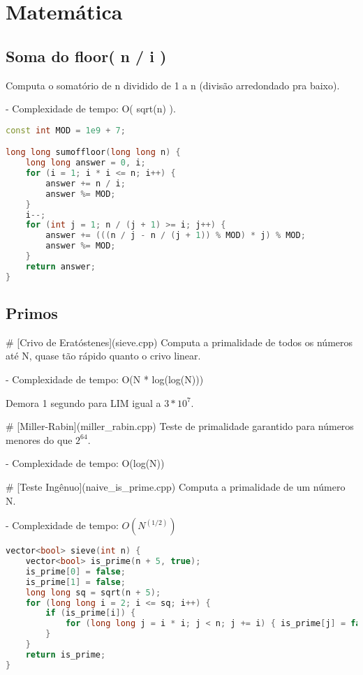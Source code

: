 \documentclass[11pt, a4paper, twoside]{article}
\begin{document}
\newpage
%
%
%
%

\section{Matemática}


\subsection{Soma do floor( n / i )}



Computa o somatório de n dividido de 1 a n (divisão arredondado pra baixo).

- Complexidade de tempo: O( sqrt(n) ).

\begin{lstlisting}[language=C++]
const int MOD = 1e9 + 7;

long long sumoffloor(long long n) {
    long long answer = 0, i;
    for (i = 1; i * i <= n; i++) {
        answer += n / i;
        answer %= MOD;
    }
    i--;
    for (int j = 1; n / (j + 1) >= i; j++) {
        answer += (((n / j - n / (j + 1)) % MOD) * j) % MOD;
        answer %= MOD;
    }
    return answer;
}
\end{lstlisting}

\subsection{Primos}



\# [Crivo de Eratóstenes](sieve.cpp)
Computa a primalidade de todos os números até N, quase tão rápido quanto o crivo linear.

- Complexidade de tempo: O(N * log(log(N)))

Demora 1 segundo para LIM igual a $3 * 10^7$.

\# [Miller-Rabin](miller\_rabin.cpp)
Teste de primalidade garantido para números menores do que $2^64$.

- Complexidade de tempo: O(log(N))

\# [Teste Ingênuo](naive\_is\_prime.cpp)
Computa a primalidade de um número N.

- Complexidade de tempo: $O(N^(1/2))$

\begin{lstlisting}[language=C++]
vector<bool> sieve(int n) {
    vector<bool> is_prime(n + 5, true);
    is_prime[0] = false;
    is_prime[1] = false;
    long long sq = sqrt(n + 5);
    for (long long i = 2; i <= sq; i++) {
        if (is_prime[i]) {
            for (long long j = i * i; j < n; j += i) { is_prime[j] = false; }
        }
    }
    return is_prime;
}
\end{lstlisting}
\end{document}

